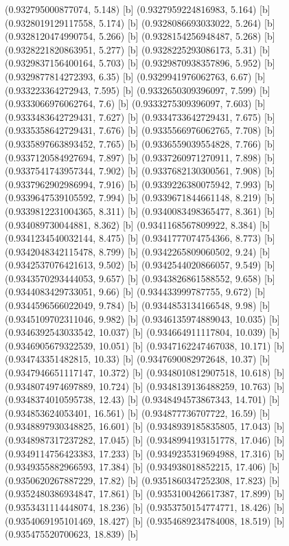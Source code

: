 {{{(0.932795000877074, 5.148) [b] 
(0.9327959224816983, 5.164) [b] 
(0.9328019129117558, 5.174) [b] 
(0.9328086693033022, 5.264) [b] 
(0.9328120474990754, 5.266) [b] 
(0.9328154256948487, 5.268) [b] 
(0.9328221820863951, 5.277) [b] 
(0.9328225293086173, 5.31) [b] 
(0.9329837156400164, 5.703) [b] 
(0.9329870938357896, 5.952) [b] 
(0.9329877814272393, 6.35) [b] 
(0.9329941976062763, 6.67) [b] 
(0.933223364272943, 7.595) [b] 
(0.9332650309396097, 7.599) [b] 
(0.9333066976062764, 7.6) [b] 
(0.9333275309396097, 7.603) [b] 
(0.9333483642729431, 7.627) [b] 
(0.9334733642729431, 7.675) [b] 
(0.9335358642729431, 7.676) [b] 
(0.9335566976062765, 7.708) [b] 
(0.9335897663893452, 7.765) [b] 
(0.9336559039554828, 7.766) [b] 
(0.9337120584927694, 7.897) [b] 
(0.9337260971270911, 7.898) [b] 
(0.9337541743957344, 7.902) [b] 
(0.9337682130300561, 7.908) [b] 
(0.9337962902986994, 7.916) [b] 
(0.9339226380075942, 7.993) [b] 
(0.9339647539105592, 7.994) [b] 
(0.9339671844661148, 8.219) [b] 
(0.9339812231004365, 8.311) [b] 
(0.9340083498365477, 8.361) [b] 
(0.934089730044881, 8.362) [b] 
(0.9341168567809922, 8.384) [b] 
(0.9341234540032144, 8.475) [b] 
(0.9341777074754366, 8.773) [b] 
(0.9342048342115478, 8.799) [b] 
(0.9342265809060502, 9.24) [b] 
(0.9342537076421613, 9.502) [b] 
(0.9342544020866057, 9.549) [b] 
(0.9343570293444053, 9.657) [b] 
(0.9343826861588552, 9.658) [b] 
(0.9344083429733051, 9.66) [b] 
(0.934433999787755, 9.672) [b] 
(0.9344596566022049, 9.784) [b] 
(0.9344853134166548, 9.98) [b] 
(0.9345109702311046, 9.982) [b] 
(0.9346135974889043, 10.035) [b] 
(0.9346392543033542, 10.037) [b] 
(0.934664911117804, 10.039) [b] 
(0.9346905679322539, 10.051) [b] 
(0.9347162247467038, 10.171) [b] 
(0.934743351482815, 10.33) [b] 
(0.9347690082972648, 10.37) [b] 
(0.9347946651117147, 10.372) [b] 
(0.9348010812907518, 10.618) [b] 
(0.9348074974697889, 10.724) [b] 
(0.9348139136488259, 10.763) [b] 
(0.9348374010595738, 12.43) [b] 
(0.9348494573867343, 14.701) [b] 
(0.934853624053401, 16.561) [b] 
(0.934877736707722, 16.59) [b] 
(0.9348897930348825, 16.601) [b] 
(0.9348939185835805, 17.043) [b] 
(0.9348987317237282, 17.045) [b] 
(0.9348994193151778, 17.046) [b] 
(0.9349114756423383, 17.233) [b] 
(0.9349235319694988, 17.316) [b] 
(0.9349355882966593, 17.384) [b] 
(0.934938018852215, 17.406) [b] 
(0.9350620267887229, 17.82) [b] 
(0.9351860347252308, 17.823) [b] 
(0.9352480386934847, 17.861) [b] 
(0.9353100426617387, 17.899) [b] 
(0.9353431114448074, 18.236) [b] 
(0.9353750154774771, 18.426) [b] 
(0.9354069195101469, 18.427) [b] 
(0.9354689234784008, 18.519) [b] 
(0.935475520700623, 18.839) [b] 
}}}
